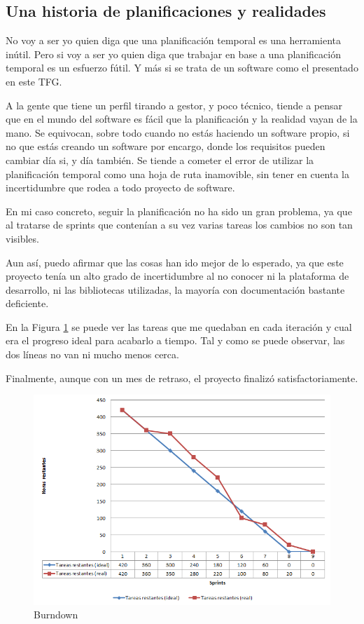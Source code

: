 \subsection{Una historia de planificaciones y realidades}
No voy a ser yo quien diga que una planificaci\'on temporal es una herramienta in\'util.
Pero si voy a ser yo quien diga que trabajar en base a una planificaci\'on temporal es
un esfuerzo f\'util. Y m\'as si se trata de un software como el presentado
en este TFG.

A la gente que tiene un perfil tirando a gestor, y poco t\'ecnico, tiende a pensar
que en el mundo del software es f\'acil que la planificaci\'on y la realidad
vayan de la mano. Se equivocan, sobre todo cuando no est\'as haciendo un software propio,
si no que est\'as creando un software por encargo, donde los requisitos pueden
cambiar d\'ia si, y d\'ia tambi\'en. Se tiende a cometer el error de utilizar la planificaci\'on
temporal como una hoja de ruta inamovible, sin tener en cuenta la incertidumbre que rodea
a todo proyecto de software.

En mi caso concreto, seguir la planificaci\'on no ha sido un gran problema, ya que al tratarse
de sprints que conten\'ian a su vez varias tareas los cambios no son tan visibles.

Aun as\'i, puedo afirmar que las cosas han ido mejor de lo esperado, ya que este proyecto
ten\'ia un alto grado de incertidumbre al no conocer ni la plataforma de desarrollo, ni las
bibliotecas utilizadas, la mayor\'ia con documentaci\'on bastante deficiente.

En la Figura \ref{fig:burndown} se puede ver las tareas que me quedaban en cada iteraci\'on
y cual era el progreso ideal para acabarlo a tiempo. Tal y como se puede observar,
las dos l\'ineas no van ni mucho menos cerca.

Finalmente, aunque con un mes de retraso, el proyecto finaliz\'o satisfactoriamente.

\begin{figure}[h]
    \centering
    \includegraphics[width=1.0\linewidth]{./Figures/burndown.png}
    \caption{Burndown}
    \label{fig:burndown}
\end{figure}

